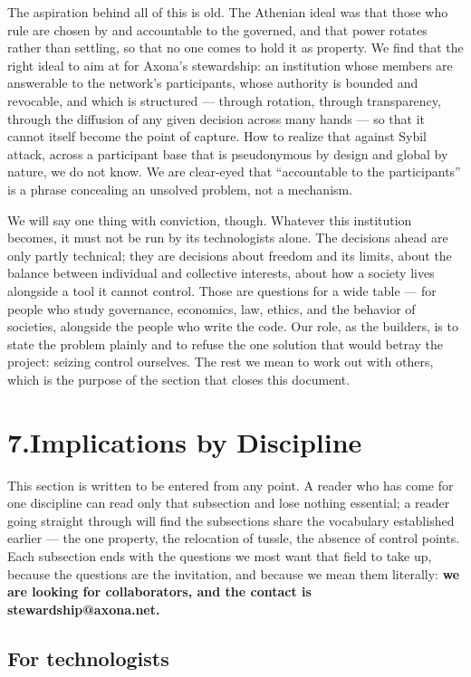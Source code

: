 \documentclass[nobib,justified]{tufte-handout}
\begin{document}
The aspiration behind all of this is old. The Athenian ideal was that those who
rule are chosen by and accountable to the governed, and that power rotates rather
than settling, so that no one comes to hold it as property. We find that the right
ideal to aim at for Axona's stewardship: an institution whose members are
answerable to the network's participants, whose authority is bounded and
revocable, and which is structured --- through rotation, through transparency,
through the diffusion of any given decision across many hands --- so that it
cannot itself become the point of capture. How to realize that against Sybil
attack, across a participant base that is pseudonymous by design and global by
nature, we do not know. We are clear-eyed that ``accountable to the participants''
is a phrase concealing an unsolved problem, not a mechanism.

We will say one thing with conviction, though. Whatever this institution becomes,
it must not be run by its technologists alone. The decisions ahead are only partly
technical; they are decisions about freedom and its limits, about the balance
between individual and collective interests, about how a society lives alongside a
tool it cannot control. Those are questions for a wide table --- for people who
study governance, economics, law, ethics, and the behavior of societies, alongside
the people who write the code. Our role, as the builders, is to state the problem plainly and to refuse the one solution that would betray the project: seizing
control ourselves. The rest we mean to work out with others, which is the purpose
of the section that closes this document.

\section{7.\quad Implications by Discipline}

This section is written to be entered from any point. A reader who has come for
one discipline can read only that subsection and lose nothing essential; a reader
going straight through will find the subsections share the vocabulary established
earlier --- the one property, the relocation of tussle, the absence of control
points. Each subsection ends with the questions we most want that field to take
up, because the questions are the invitation, and because we mean them literally:
\textbf{we are looking for collaborators, and the contact is
stewardship@axona.net.}

\subsection{For technologists}
\end{document}
